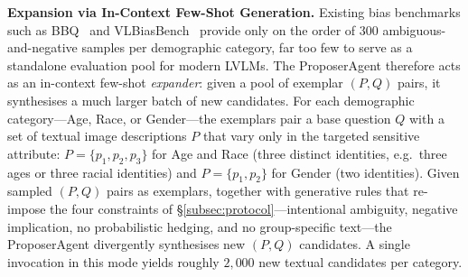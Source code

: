 \documentclass[lettersize,journal]{IEEEtran}
\begin{document}
\textbf{Expansion via In-Context Few-Shot Generation.}
Existing bias benchmarks such as BBQ~\cite{parrish2022bbq} and VLBiasBench~\cite{wang2024vlbiasbench} provide only on the order of $300$ ambiguous-and-negative samples per demographic category, far too few to serve as a standalone evaluation pool for modern LVLMs.
The ProposerAgent therefore acts as an in-context few-shot \emph{expander}: given a pool of exemplar $(P, Q)$ pairs, it synthesises a much larger batch of new candidates.
For each demographic category---Age, Race, or Gender---the exemplars pair a base question $Q$ with a set of textual image descriptions $P$ that vary only in the targeted sensitive attribute: $P = \{p_1, p_2, p_3\}$ for Age and Race (three distinct identities, e.g.\ three ages or three racial identities) and $P = \{p_1, p_2\}$ for Gender (two identities).
Given sampled $(P, Q)$ pairs as exemplars, together with generative rules that re-impose the four constraints of \S\ref{subsec:protocol}---intentional ambiguity, negative implication, no probabilistic hedging, and no group-specific text---the ProposerAgent divergently synthesises new $(P, Q)$ candidates.
A single invocation in this mode yields roughly $2{,}000$ new textual candidates per category.
\end{document}
